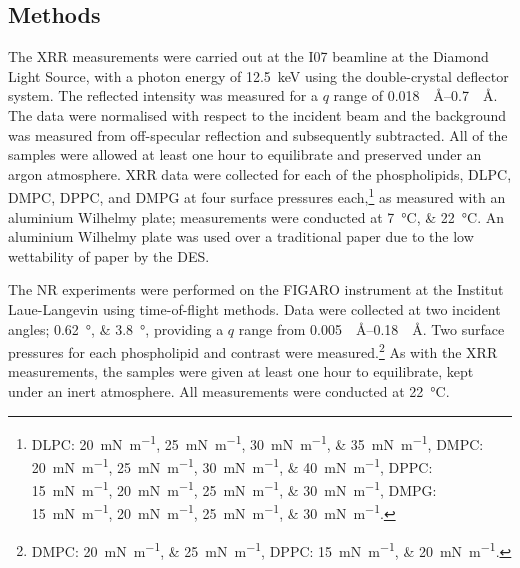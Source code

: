 \subsection{Methods}
The XRR measurements were carried out at the I07 beamline at the Diamond Light Source, with a photon energy of \SI{12.5}{\kilo\electronvolt} using the double-crystal deflector system.\autocite{arnold_implementation_2012}
The reflected intensity was measured for a $q$ range of \SIrange{0.018}{0.7}{\per\angstrom}.
The data were normalised with respect to the incident beam and the background was measured from off-specular reflection and subsequently subtracted.
All of the samples were allowed at least one hour to equilibrate and preserved under an argon atmosphere.
XRR data were collected for each of the phospholipids, DLPC, DMPC, DPPC, and DMPG at four surface pressures each,\footnote{DLPC: \SIlist{20;25;30;35}{\milli\newton\per\meter}, DMPC: \SIlist{20;25;30;40}{\milli\newton\per\meter}, DPPC: \SIlist{15;20;25;30}{\milli\newton\per\meter}, DMPG: \SIlist{15;20;25;30}{\milli\newton\per\meter}.} as measured with an aluminium Wilhelmy plate; measurements were conducted at \SIlist{7;22}{\celsius}.
An aluminium Wilhelmy plate was used over a traditional paper due to the low wettability of paper by the DES.

The NR experiments were performed on the FIGARO instrument at the Institut Laue-Langevin using time-of-flight methods.\autocite{campbell_figaro_2011}
Data were collected at two incident angles; \SIlist{0.62;3.8}{\degree}, providing a $q$ range from \SIrange{0.005}{0.18}{\per\angstrom}.
Two surface pressures for each phospholipid and contrast were measured.\footnote{DMPC: \SIlist{20;25}{\milli\newton\per\meter}, DPPC: \SIlist{15;20}{\milli\newton\per\meter}.}
As with the XRR measurements, the samples were given at least one hour to equilibrate, kept under an inert atmosphere.
All measurements were conducted at \SI{22}{\celsius}.
